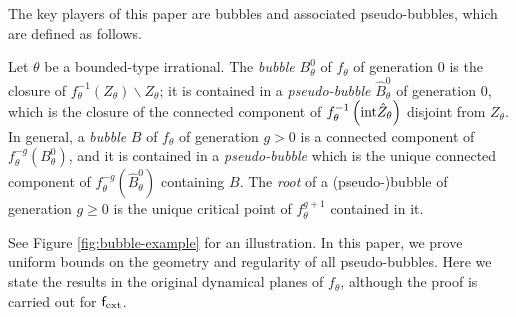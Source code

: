 \documentclass{amsart}
\begin{document}
The key players of this paper are bubbles and associated pseudo-bubbles, which are defined as follows.

\begin{definition}
\label{def:bubbles}
    Let $\theta$ be a bounded-type irrational.
    The \emph{bubble} $B_{\theta}^0$ of $f_\theta$ of generation $0$ is the closure of $f_\theta^{-1}(Z_\theta)\backslash Z_\theta$; it is contained in a \emph{pseudo-bubble} $\hat{B}_{\theta}^0$ of generation $0$, which is the closure of the connected component of $f_\theta^{-1}\left( \textnormal{int}\hat{Z}_\theta\right)$ disjoint from $Z_\theta$.
    In general, a \emph{bubble} $B$ of $f_\theta$ of generation $g>0$ is a connected component of $f_\theta^{-g}(B_{\theta}^0)$, and it is contained in a \emph{pseudo-bubble} which is the unique connected component of $f_\theta^{-g}\left(\hat{B}_{\theta}^0 \right)$ containing $B$. 
    The \emph{root} of a (pseudo-)bubble of generation $g\geq 0$ is the unique critical point of $f_\theta^{g+1}$ contained in it.
\end{definition}

See Figure \ref{fig:bubble-example} for an illustration.
In this paper, we prove uniform bounds on the geometry and regularity of all pseudo-bubbles. 
Here we state the results in the original dynamical planes of $f_\theta$, although the proof is carried out for $\mathsf{f}_{\textnormal{ext}}$.  
\end{document}
